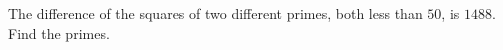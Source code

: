 The difference of the squares of two different primes, both less than $50$, is $1488$. Find the primes.
